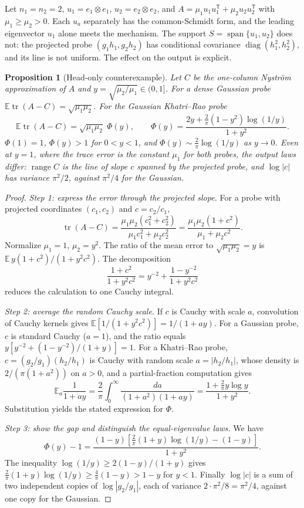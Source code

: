 \documentclass[11pt,a4paper]{article}
\newtheorem{proposition}[theorem]{Proposition}
\theoremstyle{definition}
\theoremstyle{remark}
\numberwithin{equation}{section}
\newcommand{\E}{\mathbb E}
\newcommand{\T}{{\mathsf T}}
\newcommand{\tr}{\operatorname{tr}}
\newcommand{\range}{\operatorname{range}}
\newcommand{\diag}{\operatorname{diag}}
\begin{document}
Let $n_1=n_2=2$, $u_1=e_1\otimes e_1$, $u_2=e_2\otimes e_2$, and
$A=\mu_1u_1u_1^\T+\mu_2u_2u_2^\T$ with $\mu_1\ge\mu_2>0$. Each $u_a$ separately
has the common-Schmidt form, and the leading eigenvector $u_1$ alone meets the
mechanism. The support $S=\operatorname{span}\{u_1,u_2\}$ does not: the
projected probe $(g_1h_1,g_2h_2)$ has conditional covariance
$\diag(h_1^2,h_2^2)$, and its line is not uniform. The effect on the output is
explicit.

\begin{proposition}[Head-only counterexample]\label{prop:headonly}
Let $C$ be the one-column Nystr\"om approximation of $A$ and $y=\sqrt{\mu_2/\mu_1}\in(0,1]$.
For a dense Gaussian probe $\E\tr(A-C)=\sqrt{\mu_1\mu_2}$. For the Gaussian
Khatri--Rao probe
\[
 \E\tr(A-C)=\sqrt{\mu_1\mu_2}\;\Phi(y),\qquad
 \Phi(y)=\frac{2y+\frac2\pi(1-y^2)\log(1/y)}{1+y^2}.
\]
$\Phi(1)=1$, $\Phi(y)>1$ for $0<y<1$, and $\Phi(y)\sim\frac2\pi\log(1/y)$ as
$y\to0$. Even at $y=1$, where the trace error is the constant $\mu_1$ for both
probes, the output laws differ: $\range C$ is the line of slope $c$ spanned by
the projected probe, and $\log|c|$ has variance $\pi^2/2$, against $\pi^2/4$
for the Gaussian.
\end{proposition}

\begin{proof}
\emph{Step 1: express the error through the projected slope.}
For a probe with projected coordinates $(c_1,c_2)$ and $c=c_2/c_1$,
\[
 \tr(A-C)=\frac{\mu_1\mu_2(c_1^2+c_2^2)}{\mu_1c_1^2+\mu_2c_2^2}
 =\frac{\mu_1\mu_2(1+c^2)}{\mu_1+\mu_2c^2}.
\]
Normalize $\mu_1=1$, $\mu_2=y^2$. The ratio of the mean error to
$\sqrt{\mu_1\mu_2}=y$ is $\E\,y(1+c^2)/(1+y^2c^2)$. The decomposition
\[
 \frac{1+c^2}{1+y^2c^2}
 =y^{-2}+\frac{1-y^{-2}}{1+y^2c^2}
\]
reduces the calculation to one Cauchy integral.

\emph{Step 2: average the random Cauchy scale.} If $c$ is Cauchy with scale
$a$, convolution of Cauchy kernels gives $\E[1/(1+y^2c^2)]=1/(1+ay)$.
For a Gaussian probe, $c$ is standard Cauchy ($a=1$), and the ratio equals
$y[y^{-2}+(1-y^{-2})/(1+y)]=1$. For a Khatri--Rao probe,
$c=(g_2/g_1)(h_2/h_1)$ is Cauchy with random scale $a=|h_2/h_1|$, whose density
is $2/(\pi(1+a^2))$ on $a>0$, and a partial-fraction computation gives
\[
 \E_a\frac1{1+ay}=\frac2\pi\int_0^\infty\frac{da}{(1+a^2)(1+ay)}
 =\frac{1+\frac2\pi y\log y}{1+y^2}.
\]
Substitution yields the stated expression for $\Phi$.

\emph{Step 3: show the gap and distinguish the equal-eigenvalue laws.}
We have
\[
 \Phi(y)-1
 =\frac{(1-y)[\frac2\pi(1+y)\log(1/y)-(1-y)]}{1+y^2}.
\]
The inequality
$\log(1/y)\ge2(1-y)/(1+y)$ gives
$\frac2\pi(1+y)\log(1/y)\ge\frac4\pi(1-y)>1-y$ for $y<1$. Finally
$\log|c|$ is a sum of two independent copies of $\log|g_2/g_1|$, each of
variance $2\cdot\pi^2/8=\pi^2/4$, against one copy for the Gaussian.
\end{proof}
\end{document}
